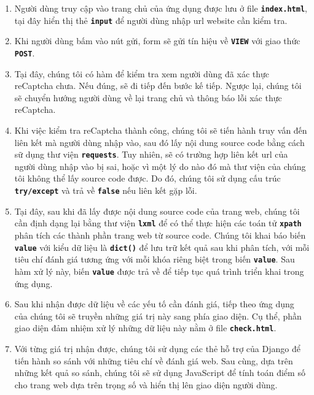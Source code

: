 \begin{enumerate}
	\item Người dùng truy cập vào trang chủ của ứng dụng được lưu ở file \textbf{\texttt{index.html}}, tại đây hiển thị thẻ \textbf{\texttt{input}} để người dùng nhập url website cần kiểm tra.
	\item Khi người dùng bấm vào nút gửi, form sẽ gửi tín hiệu về \textbf{\texttt{VIEW}} với giao thức \textbf{\texttt{POST}}.
	\item Tại đây, chúng tôi có hàm để kiểm tra xem người dùng đã xác thực reCaptcha chưa. Nếu đúng, sẽ đi tiếp đến bước kế tiếp. Ngược lại, chúng tôi sẽ chuyển hướng người dùng về lại trang chủ và thông báo lỗi xác thực reCaptcha.
	\item Khi việc kiểm tra reCaptcha thành công, chúng tôi sẽ tiến hành truy vấn đến liên kết mà người dùng nhập vào, sau đó lấy nội dung source code bằng cách sữ dụng thư viện \textbf{\texttt{requests}}. Tuy nhiên, sẽ có trường hợp liên kết url của người dùng nhập vào bị sai, hoặc vì một lý do nào đó mà thư viện của chúng tôi không thể lấy source code được. Do đó, chúng tôi sử dụng cấu trúc \textbf{\texttt{try/except}} và trả về \textbf{\texttt{false}} nếu liên kết gặp lỗi.
	\item Tại đây, sau khi đã lấy được nội dung source code của trang web, chúng tôi cần định dạng lại bằng thư viện \textbf{\texttt{lxml}} để có thể thực hiện các toán tử \textbf{\texttt{xpath}} phân tích các thành phần trang web từ source code. Chúng tôi khai báo biến \textbf{\texttt{value}} với kiểu dữ liệu là \textbf{\texttt{dict()}} để lưu trữ kết quả sau khi phân tích, với mỗi tiêu chí đánh giá tương ứng với mỗi khóa riêng biệt trong biến \textbf{\texttt{value}}. Sau hàm xử lý này, biến \textbf{\texttt{value}} được trả về để tiếp tục quá trình triển khai trong ứng dụng.
	\item Sau khi nhận được dữ liệu về các yếu tố cần đánh giá, tiếp theo ứng dụng của chúng tôi sẽ truyền những giá trị này sang phía giao diện. Cụ thể, phần giao diện đảm nhiệm xử lý những dữ liệu này nằm ở file \textbf{\texttt{check.html}}.
	\item Với từng giá trị nhận được, chúng tôi sử dụng các thẻ hỗ trợ của Django để tiến hành so sánh với những tiêu chí về đánh giá web. Sau cùng, dựa trên những kết quả so sánh, chúng tôi sẽ sử dụng JavaScript để tính toán điểm số cho trang web dựa trên trọng số và hiển thị lên giao diện người dùng.
\end{enumerate}
